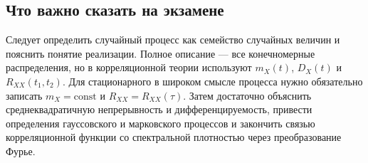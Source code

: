 \subsection{Что важно сказать на экзамене}

Следует определить случайный процесс как семейство случайных величин и пояснить
понятие реализации. Полное описание --- все конечномерные распределения, но в
корреляционной теории используют $m_X(t)$, $D_X(t)$ и
$R_{XX}(t_1,t_2)$. Для стационарного в широком смысле процесса нужно обязательно
записать $m_X=\mathrm{const}$ и $R_{XX}=R_{XX}(\tau)$. Затем достаточно
объяснить среднеквадратичную непрерывность и дифференцируемость, привести
определения гауссовского и марковского процессов и закончить связью
корреляционной функции со спектральной плотностью через преобразование Фурье.

\newpage
